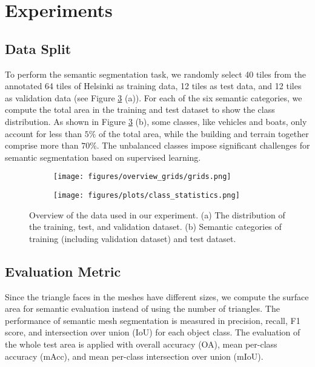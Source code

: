 \section{Experiments}\label{sec:expri}
\subsection{Data Split}

To perform the semantic segmentation task, we randomly select 40 tiles from the annotated 64 tiles of Helsinki as training data, 12 tiles as test data, and 12 tiles as validation data (see Figure \ref{fig:datadesp} (a)).
For each of the six semantic categories, we compute the total area in the training and test dataset to show the class distribution.
As shown in Figure \ref{fig:datadesp} (b), some classes, like vehicles and boats, only account for less than $5\%$ of the total area,
while the building and terrain together comprise more than $70\%$.
The unbalanced classes impose significant challenges for semantic segmentation based on supervised learning.

\begin{figure}[!tb]
	\begin{subfigure}[b]{0.38\textwidth}
		\texttt{[image: figures/overview\_grids/grids.png]}
		\label{fig:grids}
		\caption{}
	\end{subfigure}
	\hspace*{\fill}
	\begin{subfigure}[b]{0.58\textwidth}		
		\texttt{[image: figures/plots/class\_statistics.png]}
		\label{fig:class_statistics}
		\caption{}
	\end{subfigure}
	\caption{Overview of the data used in our experiment. (a) The distribution of the training, test, and validation dataset. (b) Semantic categories of training (including validation dataset) and test dataset.}
	\label{fig:datadesp}
\end{figure}

\subsection{Evaluation Metric}
Since the triangle faces in the meshes have different sizes, we compute the surface area for semantic evaluation instead of using the number of triangles. The performance of semantic mesh segmentation is measured in precision, recall, F1 score, and intersection over union (IoU) for each object class. The evaluation of the whole test area is applied with overall accuracy (OA), mean per-class accuracy (mAcc), and mean per-class intersection over union (mIoU).

